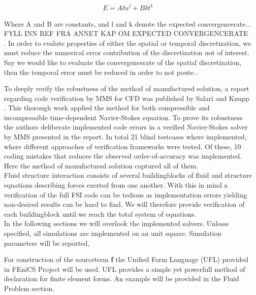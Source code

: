 \begin{align*}
E = A \delta x^l + B \delta t^k
\end{align*}


Where A and B are constants, and l and k denote the expected convergencerate... FYLL INN REF FRA ANNET KAP OM EXPECTED CONVERGENCERATE \\. In order to evalute properties of either the spatial or temporal discretization, we must reduce the numerical error contribution of the discretization not of interest. Say we would like to evaluate the convergencerate of the spatial discretization, then the temporal error must be reduced in order to not poute.. 



To deeply verify the robustness of the method of manufactured solution,  a report regarding code verification by MMS for CFD was published by Salari and Knupp \cite{Biggs}. This thorough work applied the method for both compressible and incompressible time-dependent Navier-Stokes equation. To prove its robustness the authors deliberate implemented  code errors in a verified Navier-Stokes solver by MMS presented in the report. In total 21 blind testcases where implemented, where different approaches of verification frameworks were tested. 
Of these, 10 coding mistakes that reduces the observed order-of-accuracy was implemented. Here the method of manufactured solution captured all of them. \\




Fluid structure interaction consists of several buildingblocks of fluid and structure equations describing forces exerted from one another. With this in mind a verification of the full FSI code can be tedious as implementation errors yielding non-desired results can be hard to find. We will therefore provide verification of each buildingblock until we reach the total system of equations. \\

In the following sections we will overlook the implemented solvers. Unlesss specified, all simulations are implemented on an unit square. Simulation parameters will be reported, 

For construction of the sourceterm \textbf{f} the Unified Form Language (UFL) \cite{Project2016} provided in FEniCS Project will be used. UFL provides a simple yet powerfull method of declaration for finite element forms. An example will be provided in the Fluid Problem section. 

